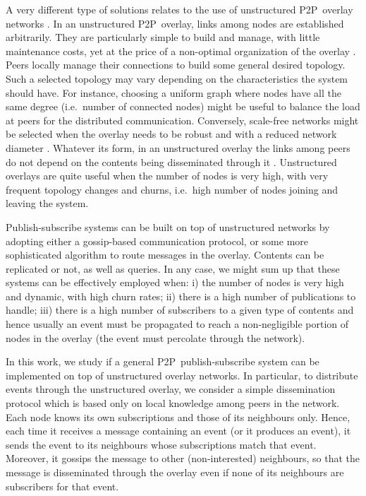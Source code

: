 \documentclass[10pt, conference, compsocconf]{IEEEtran}
\begin{document}
A very different type of solutions relates to the use of unstructured \ac{P2P}~overlay networks \cite{Terpstra:2007,sub2sub,Wong:2008}. In an unstructured \ac{P2P}~overlay, links among nodes are established arbitrarily. 
They are particularly simple to build and manage, with little maintenance costs, yet at the price of a non-optimal organization of the overlay \cite{Lin:2009}. 
Peers locally manage their connections to build some general desired topology. Such a selected topology may vary depending on the characteristics the system should have. For instance, choosing a uniform graph where nodes have all the same degree (i.e.~number of connected nodes) might be useful to balance the load at peers for the distributed communication. Conversely, scale-free networks might be selected when the overlay needs to be robust and with a reduced network diameter \cite{newmanHandbook}. 
Whatever its form, in an unstructured overlay the links among peers do not depend on the contents being disseminated through it \cite{EberspacherS05a}.
Unstructured overlays are quite useful when the number of nodes is very high, with very frequent topology changes and churns, i.e.~high number of nodes joining and leaving the system.

Publish-subscribe systems can be built on top of unstructured networks by adopting either a gossip-based communication protocol, or some more sophisticated algorithm to route messages in the overlay. Contents can be replicated or not, as well as queries. In any case, we might sum up that these systems can be effectively employed when: 
i) the number of nodes is very high and dynamic, with high churn rates; 
ii) there is a high number of publications to handle; 
iii) there is a high number of subscribers to a given type of contents and hence usually an event must be propagated to reach a non-negligible portion of nodes in the overlay (the event must percolate through the network).

In this work, we study if a general \ac{P2P}~publish-subscribe system can be implemented on top of unstructured overlay networks. In particular, to distribute events through the unstructured overlay, we consider a simple dissemination protocol which is based only on local knowledge among peers in the network. 
Each node knows its own subscriptions and those of its neighbours only. Hence, each time it receives a message containing an event (or it produces an event), it sends the event to its neighbours whose subscriptions match that event. Moreover, it gossips the message to other (non-interested) neighbours, so that the message is disseminated through the overlay even if none of its neighbours are subscribers for that event.
\end{document}
